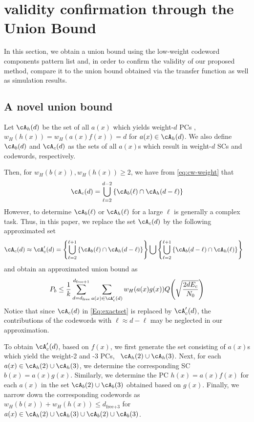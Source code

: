 \section{validity confirmation through the Union Bound}
\label{sec4}
 In this section, we obtain a union bound using the low-weight codeword components pattern list and,  in order to confirm the validity of our proposed method, compare it to the union bound obtained via the transfer function as well as simulation results.

\subsection{A novel union bound}
Let $\cA_h(d)$ be the set of all $a(x)$ which yields weight-$d$ PCs \ie, $w_H(h(x))=w_H(a(x)f(x))=d$ for $a(x) \in \cA_h(d)$. We also define $\cA_b(d)$ and $\cA_c(d)$ as the sets of all $a(x)$s which result in weight-$d$ SCs and codewords, respectively.

Then, for $w_H(b(x)), w_H(h(x)) \geq 2$, we have from \eqref{eq:cw-weight} that
\begin{align}
\cA_c(d) = \bigcup_{\ell = 2}^{d-2} \left\{\cA_b(\ell) \cap \cA_h(d-\ell)\right\}
\label{Eq:exactset}
\end{align}
However, to determine $\cA_b(\ell)$ or $\cA_h(\ell)$ for a large $\ell$ is generally a complex task. Thus, in this paper, we replace the set $\cA_c(d)$ by the following approximated set %
\begin{equation}
\begin{split}
\cA_c(d) \approx \cA_c'(d) &= \left\{\bigcup_{\ell = 2}^{\ell+1} \left\{\cA_b(\ell) \cap \cA_h(d-\ell)\right\}\right\}\bigcup \left\{\bigcup_{\ell = 2}^{\ell+1} \left\{\cA_b(d-\ell) \cap \cA_h(\ell)\right\}\right\}
\end{split}
\label{setApprox}
\end{equation}
and obtain an approximated union bound as
\begin{align}
P_b \leq \frac{1}{k} \sum_{d=d_{\text{free}}}^{d_{\text{free}+1}} \sum_{a(x) \in \cA'_c(d)}w_H(a(x)g(x)) Q\Bigg( \sqrt{\frac{2dE_c}{N_0}}\Bigg)
\label{novelEq7}
\end{align}
Notice that since $\cA_c(d)$ in \eqref{Eq:exactset} is replaced by $\cA_c'(d)$, the contributions of the codewords with $\ell \approx d-\ell$ may be neglected in our approximation.

To obtain $\cA_c'(d)$, based on $f(x)$, we first generate the set consisting of $a(x)$s which yield the weight-2 and -3 PCs, \ie~$\cA_h(2)\cup\cA_h(3)$. Next, for each $a(x) \in \cA_h(2)\cup\cA_h(3)$, we determine the corresponding SC $b(x)=a(x)g(x)$. Similarly, we determine the PC $h(x)=a(x)f(x)$ for each $a(x)$ in the set $\cA_b(2)\cup\cA_b(3)$  obtained based on $g(x)$. Finally, we narrow down the corresponding codewords as $w_H(b(x))+w_H(h(x)) \leq d_{\text{free+3}}$ for $a(x) \in \cA_h(2)\cup\cA_h(3)\cup\cA_b(2)\cup\cA_b(3)$.

